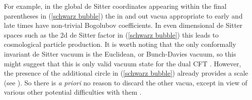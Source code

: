 \documentclass[a4paper,aps,prd,preprintnumbers,groupedaddress]{revtex4}
\begin{document}
  For example, in the global de Sitter coordinates appearing within the final parentheses in (\ref{schwarz bubble}) the in and  out vacua appropriate to early and late times have non-trivial Bogolubov coefficients.   In even dimensional de Sitter spaces
such as the 2d de Sitter factor in (\ref{schwarz bubble}) this leads to cosmological particle production.   It is worth noting that the only
conformally invariant de Sitter vacuum is the Euclidean, or Bunch-Davies vacuum, so this might suggest that this is only valid vacuum state
for the dual CFT \cite{dsalpha}.   However, the presence of the additional circle in (\ref{schwarz bubble}) already provides a scale (see
\cite{vijayross}).  So there is {\it a priori} no reason to discard the other vacua, except in view of various other potential difficulties
with them \cite{dsalpha}.
\end{document}

